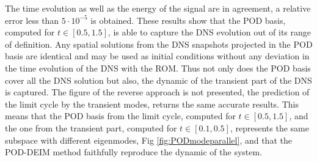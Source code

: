 \documentclass[11pt]{article}
\begin{document}
The time evolution as well as the energy of the signal are in agreement, a relative error less than $5 \cdot 10^{-5} $ is obtained. These results show that the POD basis, computed for $t\in [0.5, 1.5]$, is able to capture the DNS evolution out of its range of definition. Any spatial solutions from the DNS snapshots projected in the POD basis are identical and may be used as initial conditions without any deviation in the time evolution of the DNS with the ROM. Thus not only does the POD basis cover all the DNS solution but also, the dynamic of the transient part of the DNS is captured. The figure of the reverse approach is not presented, the prediction of the limit cycle by the transient modes, returns the same accurate results. This means that the POD basis from the limit cycle, computed for $t\in [0.5, 1.5]$, and the one from the transient part, computed for $t\in [0.1, 0.5]$, represents the same subspace with different eigenmodes, Fig \ref{fig:PODmodeparallel}, and that the POD-DEIM method faithfully reproduce the dynamic of the system. 
\end{document}
